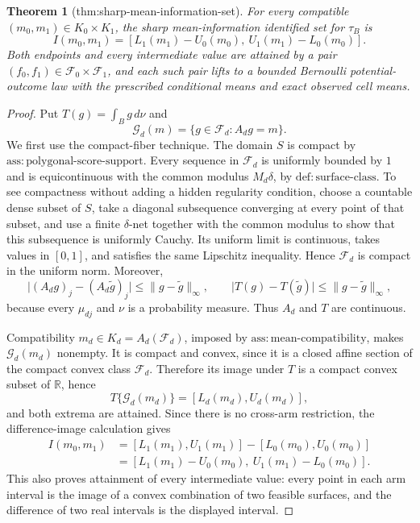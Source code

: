\documentclass{article}
\newtheorem{theorem}{Theorem}
\begin{document}
\begin{theorem}[thm:sharp-mean-information-set]\label{thm:sharp-mean-information-set}
For every compatible \((m_0,m_1)\in K_0\times K_1\), the sharp mean-information identified set for \(\tau_B\) is \[I(m_0,m_1)=[L_1(m_1)-U_0(m_0),\ U_1(m_1)-L_0(m_0)].\] Both endpoints and every intermediate value are attained by a pair \((f_0,f_1)\in\mathcal F_0\times\mathcal F_1\), and each such pair lifts to a bounded Bernoulli potential-outcome law with the prescribed conditional means and exact observed cell means.
\end{theorem}
\begin{proof}
Put \(T(g)=\int_B g\,d\nu\) and
\[
\mathcal G_d(m)=\{g\in\mathcal F_d:A_dg=m\}.
\]
We first use the compact-fiber technique.  The domain \(S\) is compact by
\(\mathrm{ass:polygonal\mbox{-}score\mbox{-}support}\).  Every sequence in
\(\mathcal F_d\) is uniformly bounded by \(1\) and is equicontinuous with the
common modulus \(M_d\delta\), by \(\mathrm{def:surface\mbox{-}class}\).  To see
compactness without adding a hidden regularity condition, choose a countable dense
subset of \(S\), take a diagonal subsequence converging at every point of that
subset, and use a finite \(\delta\)-net together with the common modulus to show
that this subsequence is uniformly Cauchy.  Its uniform limit is continuous,
takes values in \([0,1]\), and satisfies the same Lipschitz inequality.  Hence
\(\mathcal F_d\) is compact in the uniform norm.  Moreover,
\[
 \lvert (A_dg)_j-(A_d\widetilde g)_j\rvert
 \leq \lVert g-\widetilde g\rVert_\infty,
 \qquad
 \lvert T(g)-T(\widetilde g)\rvert
 \leq \lVert g-\widetilde g\rVert_\infty,
\]
because every \(\mu_{dj}\) and \(\nu\) is a probability measure.  Thus \(A_d\)
and \(T\) are continuous.

Compatibility \(m_d\in K_d=A_d(\mathcal F_d)\), imposed by
\(\mathrm{ass:mean\mbox{-}compatibility}\), makes \(\mathcal G_d(m_d)\)
nonempty.  It is compact and convex, since it is a closed affine section of the
compact convex class \(\mathcal F_d\).  Therefore its image under \(T\) is a
compact convex subset of \(\mathbb R\), hence
\[
 T\{\mathcal G_d(m_d)\}=[L_d(m_d),U_d(m_d)],
\]
and both extrema are attained.  Since there is no cross-arm restriction, the
difference-image calculation gives
\[
\begin{split}
 I(m_0,m_1)
 &= [L_1(m_1),U_1(m_1)]-[L_0(m_0),U_0(m_0)]\\
 &= [L_1(m_1)-U_0(m_0),\ U_1(m_1)-L_0(m_0)].
\end{split}
\]
This also proves attainment of every intermediate value: every point in each
arm interval is the image of a convex combination of two feasible surfaces, and
the difference of two real intervals is the displayed interval.


\end{proof}
\end{document}
